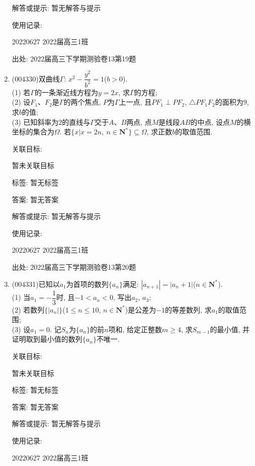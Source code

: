 \documentclass[10pt,a4paper]{article}
\begin{document}
\begin{enumerate}[1.]
解答或提示: 暂无解答与提示

使用记录:

20220627	2022届高三1班		


出处: 2022届高三下学期测验卷13第19题
\item { (004330)}双曲线$\Gamma$: $x^2-\dfrac{y^2}{b^2}=1$($b>0$).\\
(1) 若$\Gamma$的一条渐近线方程为$y=2x$, 求$\Gamma$的方程;\\
(2) 设$F_1$、$F_2$是$\Gamma$的两个焦点, $P$为$\Gamma$上一点, 且$PF_1\perp PF_2$, $\triangle PF_1F_2$的面积为$9$, 求$b$的值;\\
(3) 已知斜率为$2$的直线与$\Gamma$交于$A$、$B$两点, 点$M$是线段$AB$的中点, 设点$M$的横坐标的集合为$\Omega$. 若$\{x|x=2n,\ n\in \mathbf{N}^* \}\subseteq \Omega$, 求正数$b$的取值范围.


关联目标:

暂未关联目标



标签: 暂无标签

答案: 暂无答案

解答或提示: 暂无解答与提示

使用记录:

20220627	2022届高三1班			


出处: 2022届高三下学期测验卷13第20题
\item { (004331)}已知以$a_1$为首项的数列$\{a_n\}$满足: $|a_{n+1}|=|a_n+1|$($n\in \mathbf{N}^*$).\\
(1) 当$a_1=-\dfrac 13$时, 且$-1<a_n<0$, 写出$a_2$, $a_3$;\\
(2) 若数列$\{|a_n|\}$($1\le n\le 10$, $n\in \mathbf{N}^*$)是公差为$-1$的等差数列, 求$a_1$的取值范围;\\
(3) 设$a_1=0$. 记$S_n$为$\{a_n\}$的前$n$项和, 给定正整数$m\ge 4$, 求$S_{m-1}$的最小值, 并证明取到最小值的数列$\{a_n\}$不唯一.


关联目标:

暂未关联目标



标签: 暂无标签

答案: 暂无答案

解答或提示: 暂无解答与提示

使用记录:

20220627	2022届高三1班			



\end{enumerate}
\end{document}

